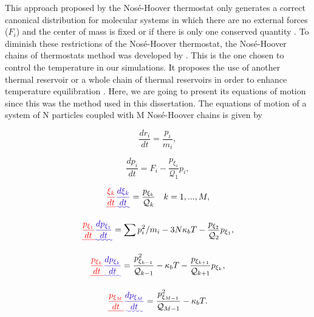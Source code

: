 \documentclass[
	12pt,				%
	openany,			%
	oneside,			%
	a4paper,			%
	english,			%
	brazil				%
	]{abntex2}
\providecommand{\DIFadd}[1]{{\protect\color{blue}\uwave{#1}}}
\providecommand{\DIFdel}[1]{{\protect\color{red}\sout{#1}}}
\providecommand{\DIFaddbegin}{}
\providecommand{\DIFaddend}{}
\providecommand{\DIFdelbegin}{}
\providecommand{\DIFdelend}{}
\providecommand{\DIFadd}[1]{{\protect\color{blue}\uwave{#1}}} %
\providecommand{\DIFdel}[1]{{\protect\color{red}\sout{#1}}}                      %
\providecommand{\DIFaddbegin}{} %
\providecommand{\DIFaddend}{} %
\providecommand{\DIFdelbegin}{} %
\providecommand{\DIFdelend}{} %
\begin{document}
This approach proposed by the Nos\'{e}-Hoover thermostat only generates a correct canonical distribution for molecular systems in which there are no external forces ($F_{i}$) and the center of mass is fixed or if there is only one conserved quantity \cite{frenkel}. To diminish these restrictions of the Nosé-Hoover thermostat, the Nosé-Hoover chains of thermostats method was developed by . This \DIFaddbegin \DIFadd{method }\DIFaddend is the one chosen to control the temperature in our simulations. It proposes the use of another thermal reservoir or a whole chain of thermal reservoirs in order to enhance temperature equilibration \cite{shell2015}. Here, we are going to present its equations of motion since this was the method used in this dissertation. The equations of motion of a system of N particles coupled with M Nos\'{e}-Hoover chains is given by

\begin{equation}
\frac{dr_{i}}{dt} = \frac{p_i}{m_i},
\end{equation}

\begin{equation}
\frac{dp_{i}}{dt} = F_i  - \frac{p_{\xi _{1}}}{\mathcal{Q} _1} p_{i},
\end{equation}

\begin{equation}
\DIFdelbegin \DIFdel{\frac{\xi _{k}}{dt} }\DIFdelend \DIFaddbegin \DIFadd{\frac{d \xi _{k}}{dt} }\DIFaddend = \frac{p_{\xi _k}}{\mathcal{Q} _{k}} \quad k = 1,...,M ,
\end{equation}

\begin{equation}
\DIFdelbegin \DIFdel{\frac{p_{\xi _1}}{dt} }\DIFdelend \DIFaddbegin \DIFadd{\frac{d p_{\xi _1}}{dt} }\DIFaddend = {\sum p_{i}^{2}/m_{i} - 3N\kappa_{b}T} -  \frac{p_{\xi _{2}}}{\mathcal{Q} _2}p_{\xi _{1}},
\end{equation}

\begin{equation}
\DIFdelbegin \DIFdel{\frac{p_{\xi _k}}{dt} }\DIFdelend \DIFaddbegin \DIFadd{\frac{dp_{\xi _k}}{dt} }\DIFaddend = \frac{p_{\xi _{k -1}}^{2}}{\mathcal{Q} _{k-1}} - \kappa_{b}T - \frac{p_{\xi _{k+1}}}{\mathcal{Q} _{k+1}}p_{\xi _{k}},
\end{equation}

\begin{equation}
\DIFdelbegin \DIFdel{\frac{p_{\xi _M}}{dt} }\DIFdelend \DIFaddbegin \DIFadd{\frac{dp_{\xi _M}}{dt} }\DIFaddend = \frac{ p_{\xi _{M-1}}^{2}}{\mathcal{Q} _{M-1}} - \kappa_{b}T .
\end{equation}
\end{document}
